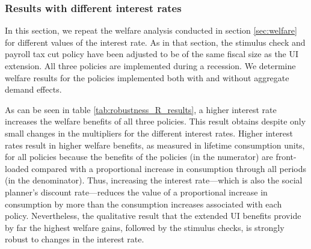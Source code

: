 \documentclass[\econtexRoot/HAFiscal]{subfiles}
\begin{document}
\subsubsection{Results with different interest rates}
\notinsubfile{\label{sec:robust_R_results}}

In this section, we repeat the welfare analysis conducted in section \ref{sec:welfare} for different values of the interest rate.
As in that section, the stimulus check and payroll tax cut policy have been adjusted to be of the same fiscal size as the UI extension.
All three policies are implemented during a recession.
We determine welfare results for the policies implemented both with and without aggregate demand effects.

As can be seen in table \ref{tab:robustness_R_results}, a higher interest rate increases the welfare benefits of all three policies.
This result obtains despite only small changes in the multipliers for the different interest rates.
Higher interest rates result in higher welfare benefits, as measured in lifetime consumption units, for all policies because the benefits of the policies (in the numerator) are front-loaded compared with a proportional increase in consumption through all periods (in the denominator).
Thus, increasing the interest rate---which is also the social planner's discount rate---reduces the value of a proportional increase in consumption by more than the consumption increases associated with each policy.
Nevertheless, the qualitative result that the extended UI benefits provide by far the highest welfare gains, followed by the stimulus checks, is strongly robust to changes in the interest rate.
\end{document}
